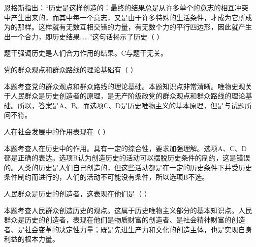 \question 恩格斯指出：``历史是这样创造的：最终的结果总是从许多单个的意志的相互冲突中产生出来的，而其中每一个意志，又是由于许多特殊的生活条件，才成为它所成为的那样。这样就有无数互相交错的力量，有无数个力的平行四边形，因此就产生出一个合力，即历史结果\ldots{}\ldots{}''这句话揭示了历史（
）
\par{}
\begin{solution}题干强调历史是人们合力作用的结果。C与题干无关。
\end{solution}
\question 党的群众观点和群众路线的理论基础有（ ）
\par{}
\begin{solution}本题考查党的群众观点和群众路线的理论基础。本题知识点非常清晰。唯物史观关于人民群众是历史创造者的原理，是无产阶级政党的群众观点和群众路线的理论基础。所以，答案是A、B。而选项C、D是历史唯物主义的基本原理，但是与试题所问不符。
\end{solution}
\question 人在社会发展中的作用表现在（ ）
\par{}
\begin{solution}本题考查人在历史中的作用。具有一定的综合性，要求加强理解。选项A、C、D都是正确的表达。选项B认为创造历史的活动可以摆脱历史条件的制约，这是错误的。人类的历史是人们自己创造的，但这些活动都是在一定的历史条件下并受历史条件制约而进行的，人们的活动不可能没有条件，所以选项B不选。
\end{solution}
\question 人民群众是历史的创造者，这表现在他们是（ ）
\par\twoch{\textcolor{red}{社会物质财富的创造者}}{\textcolor{red}{社会精神财富的创造者}}{\textcolor{red}{实现自身利益的根本力量}}{\textcolor{red}{社会历史变革的决定力量}}
\begin{solution}本题考查人民群众创造历史的观点。这属于历史唯物主义部分的基本知识点。人民群众是历史的创造者，表现在他们是物质财富的创造者、是社会精神财富的创造者、是社会变革的决定性力量；既是先进生产力和文化的创造主体，也是实现自身利益的根本力量。
\end{solution}
